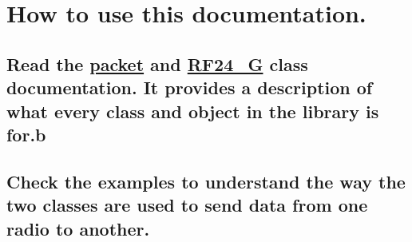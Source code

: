 \section*{How to use this documentation.}

\subsection*{Read the \hyperlink{classpacket}{packet} and \hyperlink{class_r_f24___g}{R\+F24\+\_\+G} class documentation. It provides a description of what every class and object in the library is for.\+b}

\subsection*{Check the examples to understand the way the two classes are used to send data from one radio to another.}